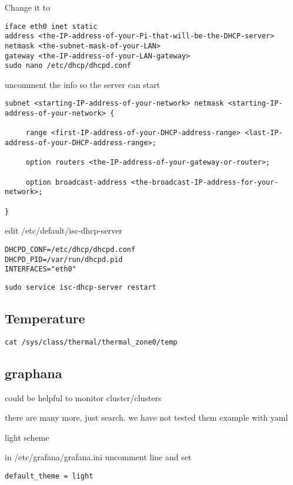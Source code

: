 Change it to 

\begin{lstlisting}
iface eth0 inet static
address <the-IP-address-of-your-Pi-that-will-be-the-DHCP-server>
netmask <the-subnet-mask-of-your-LAN>
gateway <the-IP-address-of-your-LAN-gateway>
sudo nano /etc/dhcp/dhcpd.conf
\end{lstlisting}

uncomment the info so the server can start

\begin{lstlisting}
subnet <starting-IP-address-of-your-network> netmask <starting-IP-address-of-your-network> {

     range <first-IP-address-of-your-DHCP-address-range> <last-IP-address-of-your-DHCP-address-range>;

     option routers <the-IP-address-of-your-gateway-or-router>;

     option broadcast-address <the-broadcast-IP-address-for-your-network>;

}
\end{lstlisting}

edit /etc/default/isc-dhcp-server

\begin{lstlisting}
DHCPD_CONF=/etc/dhcp/dhcpd.conf
DHCPD_PID=/var/run/dhcpd.pid
INTERFACES="eth0"
\end{lstlisting}

\begin{lstlisting}
sudo service isc-dhcp-server restart
\end{lstlisting}

\subsection{Temperature}

\begin{lstlisting}
cat /sys/class/thermal/thermal_zone0/temp
\end{lstlisting}

\subsection{graphana}

could be helpful to monitor cluster/clusters




there are many more, just search. we have not tested them
example with yaml


light scheme

in /etc/grafana/grafana.ini uncomment line and set 

\begin{lstlisting}
default_theme = light 
\end{lstlisting}

